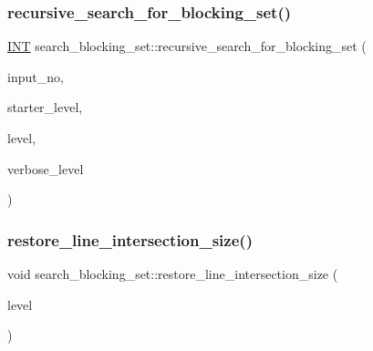 \subsubsection{\texorpdfstring{recursive\+\_\+search\+\_\+for\+\_\+blocking\+\_\+set()}{recursive\_search\_for\_blocking\_set()}}
{\footnotesize\ttfamily \mbox{\hyperlink{galois_8h_a09fddde158a3a20bd2dcadb609de11dc}{I\+NT}} search\+\_\+blocking\+\_\+set\+::recursive\+\_\+search\+\_\+for\+\_\+blocking\+\_\+set (\begin{DoxyParamCaption}\item[{\mbox{\hyperlink{galois_8h_a09fddde158a3a20bd2dcadb609de11dc}{I\+NT}}}]{input\+\_\+no,  }\item[{\mbox{\hyperlink{galois_8h_a09fddde158a3a20bd2dcadb609de11dc}{I\+NT}}}]{starter\+\_\+level,  }\item[{\mbox{\hyperlink{galois_8h_a09fddde158a3a20bd2dcadb609de11dc}{I\+NT}}}]{level,  }\item[{\mbox{\hyperlink{galois_8h_a09fddde158a3a20bd2dcadb609de11dc}{I\+NT}}}]{verbose\+\_\+level }\end{DoxyParamCaption})}

\mbox{\label{classsearch__blocking__set_a3c0e544bb6b87094c33144f742a8d0c2}} 
\subsubsection{\texorpdfstring{restore\+\_\+line\+\_\+intersection\+\_\+size()}{restore\_line\_intersection\_size()}}
{\footnotesize\ttfamily void search\+\_\+blocking\+\_\+set\+::restore\+\_\+line\+\_\+intersection\+\_\+size (\begin{DoxyParamCaption}\item[{\mbox{\hyperlink{galois_8h_a09fddde158a3a20bd2dcadb609de11dc}{I\+NT}}}]{level }\end{DoxyParamCaption})}

\mbox{\label{classsearch__blocking__set_ac6fb0a4694346d742cf11919c6de8e6a}} 
